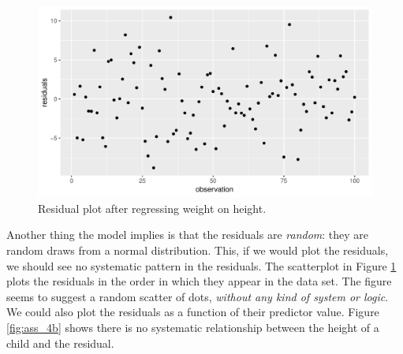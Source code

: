 \documentclass[]{report}\usepackage[]{graphicx}\usepackage[]{color}
\makeatletter
\def\maxwidth{ %
  \ifdim\Gin@nat@width>\linewidth
    \linewidth
  \else
    \Gin@nat@width
  \fi
}
\newenvironment{knitrout}{}{} %
\makeatother
\begin{document}
\begin{knitrout}
\color{fgcolor}\begin{figure}

{\centering \includegraphics[width=\maxwidth]{figure/ass_4-1} 

}

\caption[Residual plot after regressing weight on height]{Residual plot after regressing weight on height.}\label{fig:ass_4}
\end{figure}


\end{knitrout}

Another thing the model implies is that the residuals are \textit{random}: they are random draws from a normal distribution. This, if we would plot the residuals, we should see no systematic pattern in the residuals. The scatterplot in Figure \ref{fig:ass_4} plots the residuals in the order in which they appear in the data set. The figure seems to suggest a random scatter of dots, \textit{without any kind of system or logic}. We could also plot the residuals as a function of their predictor value. Figure \ref{fig:ass_4b} shows there is no systematic relationship between the height of a child and the residual.  
\end{document}
